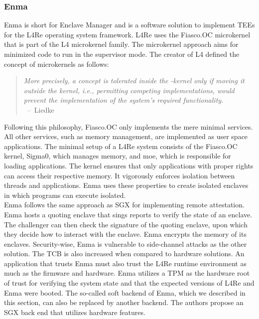 \subsubsection{Enma}
\label{sec:20:enma}
Enma is short for Enclave Manager and is a software solution to implement TEEs
for the L4Re operating system framework. \cite{reitz_isolierende_2019} L4Re uses
the Fiasco.OC microkernel that is part of the L4 microkernel family. The
microkernel approach aims for minimized code to run in the supervisor mode. The
creator of L4 defined the concept of microkernels as follows:

\begin{quote}
    \textit{ More precisely, a concept is tolerated inside the \mu-kernel only
        if moving it outside the kernel, i.e., permitting competing
        implementations, would prevent the implementation of the system's
        required functionality. \\
    } \mbox{ -- Liedke\cite{liedtke1995micro}}
\end{quote}


Following this philosophy, Fiasco.OC only implements the mere minimal services.
All other services, such as memory management, are implemented as user space
applications. The minimal setup of a L4Re system consists of the Fiasco.OC
kernel, Sigma0, which manages memory, and moe, which is responsible for loading
applications. The kernel ensures that only applications with proper rights can
access their respective memory. It vigorously enforces isolation between threads
and applications. Enma uses these properties to create isolated enclaves in
which programs can execute isolated.\\

Enma follows the same approach as SGX for implementing remote attestation. Enma
hosts a quoting enclave that sings reports to verify the state of an enclave.
The challenger can then check the signature of the quoting enclave, upon which
they decide how to interact with the enclave. Enma encrypts the memory of its
enclaves. Security-wise, Enma is vulnerable to side-channel attacks as the other
solution. The TCB is also increased when compared to hardware solutions. An
application that trusts Enma must also trust the L4Re runtime environment as
much as the firmware and hardware. Enma utilizes a TPM as the hardware root of
trust for verifying the system state and that the expected versions of L4Re and
Enma were booted. The so-called soft backend of Enma, which we described in this
section, can also be replaced by another backend. The authors propose an SGX
back end that utilizes hardware features.

